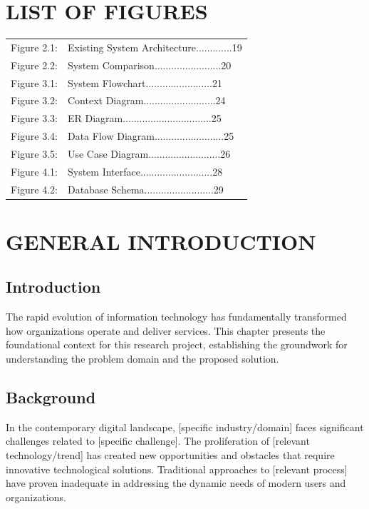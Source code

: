 \documentclass[12pt,twoside]{report}
\begin{document}
\chapter*{LIST OF FIGURES}
\begin{tabular}{ll}
Figure 2.1: & Existing System Architecture\hspace{1cm}.............19\\
Figure 2.2: & System Comparison\hspace{1cm}........................20\\
Figure 3.1: & System Flowchart\hspace{1cm}........................21\\
Figure 3.2: & Context Diagram\hspace{1cm}..........................24\\
Figure 3.3: & ER Diagram\hspace{1cm}................................25\\
Figure 3.4: & Data Flow Diagram\hspace{1cm}.........................25\\
Figure 3.5: & Use Case Diagram\hspace{1cm}..........................26\\
Figure 4.1: & System Interface\hspace{1cm}..........................28\\
Figure 4.2: & Database Schema\hspace{1cm}.........................29\\
\end{tabular}
\newpage

\tableofcontents
\newpage

\chapter{GENERAL INTRODUCTION}
\section{Introduction}
The rapid evolution of information technology has fundamentally transformed how organizations operate and deliver services. This chapter presents the foundational context for this research project, establishing the groundwork for understanding the problem domain and the proposed solution.

\section{Background}
In the contemporary digital landscape, [specific industry/domain] faces significant challenges related to [specific challenge]. The proliferation of [relevant technology/trend] has created new opportunities and obstacles that require innovative technological solutions. Traditional approaches to [relevant process] have proven inadequate in addressing the dynamic needs of modern users and organizations.
\end{document}
